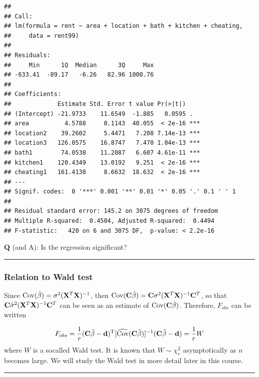 \documentclass[
]{article}
\begin{document}
\begin{verbatim}
## 
## Call:
## lm(formula = rent ~ area + location + bath + kitchen + cheating, 
##     data = rent99)
## 
## Residuals:
##     Min      1Q  Median      3Q     Max 
## -633.41  -89.17   -6.26   82.96 1000.76 
## 
## Coefficients:
##             Estimate Std. Error t value Pr(>|t|)    
## (Intercept) -21.9733    11.6549  -1.885   0.0595 .  
## area          4.5788     0.1143  40.055  < 2e-16 ***
## location2    39.2602     5.4471   7.208 7.14e-13 ***
## location3   126.0575    16.8747   7.470 1.04e-13 ***
## bath1        74.0538    11.2087   6.607 4.61e-11 ***
## kitchen1    120.4349    13.0192   9.251  < 2e-16 ***
## cheating1   161.4138     8.6632  18.632  < 2e-16 ***
## ---
## Signif. codes:  0 '***' 0.001 '**' 0.01 '*' 0.05 '.' 0.1 ' ' 1
## 
## Residual standard error: 145.2 on 3075 degrees of freedom
## Multiple R-squared:  0.4504, Adjusted R-squared:  0.4494 
## F-statistic:   420 on 6 and 3075 DF,  p-value: < 2.2e-16
\end{verbatim}

\normalsize

\textbf{Q} (and A): Is the regression significant?

\begin{center}\rule{0.5\linewidth}{0.5pt}\end{center}

\hypertarget{relation-to-wald-test}{%
\subsubsection{Relation to Wald test}\label{relation-to-wald-test}}

Since \(\text{Cov}(\hat{\beta})=\sigma^2 ({\bf X}^T{\bf X})^{-1}\), then
\(\text{Cov}({\bf C}\hat{\beta})={\bf C}\sigma^2({\bf X}^T{\bf X})^{-1}{\bf C}^T\),
so that \({\bf C}\hat{\sigma}^2({\bf X}^T{\bf X})^{-1}{\bf C}^T\) can be
seen as an estimate of \(\text{Cov}({\bf C}\hat{\beta})\). Therefore,
\(F_{obs}\) can be written

\[F_{obs}=\frac{1}{r}({\bf C}\hat{{\bf \beta}}-{\bf d})^{\text T}[\widehat{\text{Cov}}({\bf C}\hat{\beta})]^{-1}({\bf C}\hat{{\bf \beta}}-{\bf d})=\frac{1}{r}W\]
where \(W\) is a socalled Wald test. It is known that \(W\sim \chi^2_r\)
asymptotically as \(n\) becomes large. We will study the Wald test in
more detail later in this course.

\begin{center}\rule{0.5\linewidth}{0.5pt}\end{center}
\end{document}
